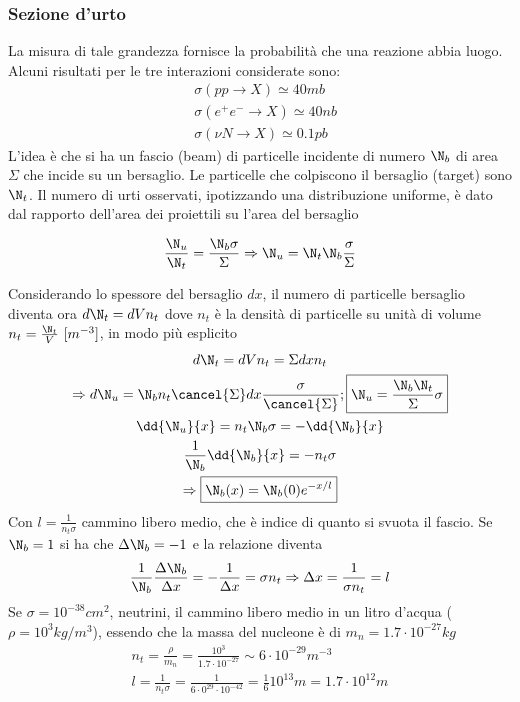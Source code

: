 \documentclass[12pt]{book}
\begin{document}
\subsubsection{Sezione d'urto}
La misura di tale grandezza fornisce la probabilità che una reazione abbia luogo. Alcuni risultati per le tre interazioni considerate sono:
\begin{align}
	&\sigma (pp \rightarrow X ) \simeq 40 mb\\
	&\sigma (e^+e^- \rightarrow X) \simeq 40 nb\\
	&\sigma (\nu N \rightarrow X ) \simeq 0.1 pb
\end{align}
L'idea è che si ha un fascio (beam) di particelle incidente di numero $\N_b$ di area $\Sigma$ che incide su un bersaglio. Le particelle che colpiscono il bersaglio (target) sono $\N_t$. Il numero di urti osservati, ipotizzando una distribuzione uniforme, è dato dal rapporto dell'area dei proiettili su l'area del bersaglio 

\begin{equation}
	\frac{\N_u}{\N_t} = \frac{\N_b \sigma}{\Sigma} \Rightarrow \N_u = \N_t \N_b \frac{\sigma}{\Sigma}
\end{equation}

Considerando lo spessore del bersaglio $dx$, il numero di particelle bersaglio diventa ora $d\N_t=dV n_t$ dove $n_t$ è la densità di particelle su unità di volume $n_t= \frac{\N_t}{V} \ [m^{-3}]$, in modo più esplicito
\begin{gather}
	d \N_t = dV n_t = \Sigma dx n_t\\
	\Rightarrow d \N_u = \N_b n_t \cancel{\Sigma} dx \frac{\sigma}{\cancel{\Sigma}} ; \boxed{\N_u=\frac{\N_b \N_t}{\Sigma}\sigma}\\
	\dd{\N_u}{x} = n_t \N_b \sigma = - \dd{\N_b}{x}\\
	\frac{1}{\N_b} \dd{\N_b}{x} = - n_t \sigma \\
	\Rightarrow \boxed{\N_b (x) = \N_b (0) e^{-x/l}} 
\end{gather}
Con $l= \frac{1}{n_t \sigma}$ cammino libero medio, che è indice di quanto si svuota il fascio. Se $\N_b=1$ si ha che $\Delta \N_b=-1$ e la relazione diventa
\begin{equation}
	\frac{1}{\N_b} \frac{\Delta \N_b}{\Delta x} = - \frac{1}{\Delta x} =  \sigma n_t \Rightarrow \Delta x = \frac{1}{\sigma n_t}= l
\end{equation}
Se $\sigma = 10^{-38}cm^2$, neutrini, il cammino libero medio in un litro d'acqua ($\rho=10^3 kg/m^3$), essendo che la massa del nucleone è di $m_n=1.7 \cdot 10^{-27}kg$
\begin{gather}
	n_t = \frac{\rho}{m_n} = \frac{10^3}{1.7 \cdot 10^{-27}} \sim 6 \cdot 10^{-29} m^{-3}\\
	l = \frac{1}{n_t \sigma} = \frac{1}{6 \cdot 0^{29} \cdot 10^{-42}} = \frac{1}{6} 10^{13} m = 1.7 \cdot 10^{12}m
\end{gather}
\end{document}
